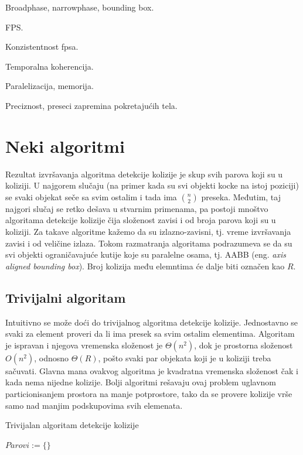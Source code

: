 \documentclass[a4paper]{article}
\newtheorem{defi}{Definicija}[section]
\begin{document}
{Broadphase, narrowphase, bounding box.

FPS. 

Konzistentnost fpsa.

Temporalna koherencija.

Paralelizacija, memorija.

Preciznost, preseci zapremina pokretajućih tela.

\section{Neki algoritmi}
\label{sec:algoritmi}

Rezultat izvršavanja algoritma detekcije kolizije je skup svih parova koji su u koliziji.
U najgorem slučaju (na primer kada su svi objekti kocke na istoj poziciji) se svaki objekat
seče sa svim ostalim i tada ima $ {n\choose 2}  $ preseka. Međutim, taj najgori slučaj se retko dešava
u stvarnim primenama, pa postoji mnoštvo algoritama detekcije kolizije čija složenost zavisi i od broja
parova koji su u koliziji. Za takave algoritme kažemo da su izlazno-zavisni, tj.
vreme izvršavanja zavisi i od veličine izlaza. Tokom razmatranja algoritama podrazumeva se da su svi
objekti ograničavajuće kutije koje su paralelne osama, tj. AABB (eng. {\em axis aligned bounding box}).
Broj kolizija među elemntima će dalje biti označen kao $R$. 






\subsection{Trivijalni algoritam}
\label{subsec:octree}

Intuitivno se može doći do trivijalnog algoritma detekcije kolizije. 
Jednostavno se svaki za element proveri da li ima presek sa svim ostalim elementima.
Algoritam je ispravan i njegova vremenska složenost je $\Theta (n^2) $, dok je prostorna složenost
$O(n^2)$, odnosno $\Theta(R)$, pošto svaki par objekata koji je u koliziji treba sačuvati.
Glavna mana ovakvog algoritma je kvadratna vremenska složenost čak i kada nema nijedne kolizije.
Bolji algoritmi rešavaju ovaj problem uglavnom particionisanjem prostora na manje potprostore, tako da
se provere kolizije vrše samo nad manjim podskupovima svih elemenata.

\begin{algorithm}
	\caption{Trivijalan algoritam detekcije kolizije}
    \label{alg:triv}
	\begin{algorithmic}[1]
		$Parovi := \{ \}$


\end{algorithmic}
\end{algorithm}}
\end{document}
